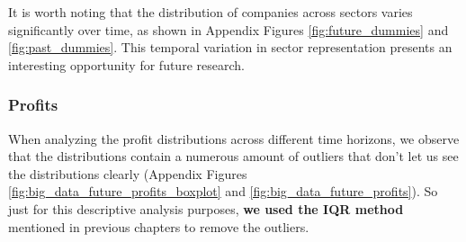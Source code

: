 \documentclass[11pt,english,a4paper,hidelinks]{book}
\begin{document}
\vspace{0.5cm}
\noindent It is worth noting that the distribution of companies across sectors varies significantly over time, as shown in Appendix Figures \ref{fig:future_dummies} and \ref{fig:past_dummies}. This temporal variation in sector representation presents an interesting opportunity for future research.

\subsubsection{Profits}

\noindent When analyzing the profit distributions across different time horizons, we observe that the distributions contain a numerous amount of outliers that don't let us see the distributions clearly (Appendix Figures \ref{fig:big_data_future_profits_boxplot} and \ref{fig:big_data_future_profits}). So just for this descriptive analysis purposes, \textbf{we used the IQR method} mentioned in previous chapters to remove the outliers.
\end{document}
